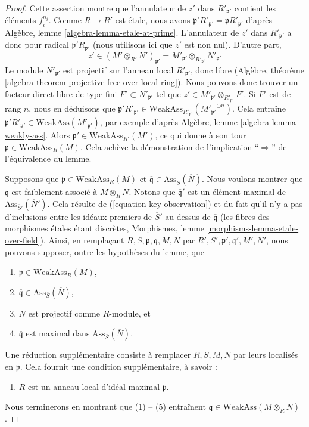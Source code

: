 \begin{proof}
\medskip\noindent
Cette assertion montre que l'annulateur de $z'$ dans $R'_{\mathfrak p'}$
contient les éléments $f_i^{n_i}$. Comme $R \to R'$ est \'etale, nous avons
$\mathfrak p'R'_{\mathfrak p'} = \mathfrak pR'_{\mathfrak p'}$
d'après Algèbre, lemme \ref{algebra-lemma-etale-at-prime}.
L'annulateur de $z'$ dans $R'_{\mathfrak p'}$ a donc pour radical
$\mathfrak p' R_{\mathfrak p'}$ (nous utilisons ici que $z'$ est non nul).
D'autre part,
$$
z' \in (M' \otimes_{R'} N')_{\mathfrak p'} =
M'_{\mathfrak p'} \otimes_{R'_{\mathfrak p'}} N'_{\mathfrak p'}
$$
Le module $N'_{\mathfrak p'}$ est projectif sur l'anneau local
$R'_{\mathfrak p'}$, donc libre
(Algèbre, théorème \ref{algebra-theorem-projective-free-over-local-ring}).
Nous pouvons donc trouver un facteur direct libre de type fini $F' \subset N'_{\mathfrak p'}$
tel que $z' \in M'_{\mathfrak p'} \otimes_{R'_{\mathfrak p'}} F'$.
Si $F'$ est de rang $n$, nous en déduisons que
$\mathfrak p' R'_{\mathfrak p'} \in
\text{WeakAss}_{R'_{\mathfrak p'}}({M'_{\mathfrak p'}}^{\oplus n})$.
Cela entraîne
$\mathfrak p'R'_{\mathfrak p'} \in \text{WeakAss}(M'_{\mathfrak p'})$,
par exemple d'après Algèbre, lemme \ref{algebra-lemma-weakly-ass}.
Alors $\mathfrak p' \in \text{WeakAss}_{R'}(M')$,
ce qui donne à son tour $\mathfrak p \in \text{WeakAss}_R(M)$.
Cela achève la démonstration de l'implication
``$\Rightarrow$'' de l'équivalence du lemme.

\medskip\noindent
Supposons que $\mathfrak p \in \text{WeakAss}_R(M)$ et
$\overline{\mathfrak q} \in \text{Ass}_{\overline{S}}(\overline{N})$.
Nous voulons montrer que $\mathfrak q$ est faiblement associé à $M \otimes_R N$.
Notons que $\overline{\mathfrak q}'$ est un élément maximal de
$\text{Ass}_{\overline{S}'}(\overline{N}')$.
Cela résulte de (\ref{equation-key-observation})
et du fait qu'il n'y a pas d'inclusions entre les idéaux premiers
de $\overline{S}'$ au-dessus de $\overline{\mathfrak q}$
(les fibres des morphismes \'etales étant discrètes,
Morphismes, lemme \ref{morphisms-lemma-etale-over-field}).
Ainsi, en remplaçant $R, S, \mathfrak p, \mathfrak q, M, N$ par
$R', S', \mathfrak p', \mathfrak q', M', N'$,
nous pouvons supposer, outre les hypothèses du lemme, que
\begin{enumerate}
\item $\mathfrak p \in \text{WeakAss}_R(M)$,
\item $\overline{\mathfrak q} \in \text{Ass}_{\overline{S}}(\overline{N})$,
\item $N$ est projectif comme $R$-module, et
\item $\overline{\mathfrak q}$ est maximal dans
$\text{Ass}_{\overline{S}}(\overline{N})$.
\end{enumerate}
Une réduction supplémentaire consiste à remplacer
$R, S, M, N$ par leurs localisés en $\mathfrak p$.
Cela fournit une condition supplémentaire, à savoir :
\begin{enumerate}
\item[(5)] $R$ est un anneau local d'idéal maximal $\mathfrak p$.
\end{enumerate}
Nous terminerons en montrant que (1) -- (5) entraînent
$\mathfrak q \in \text{WeakAss}(M \otimes_R N)$.


\end{proof}

